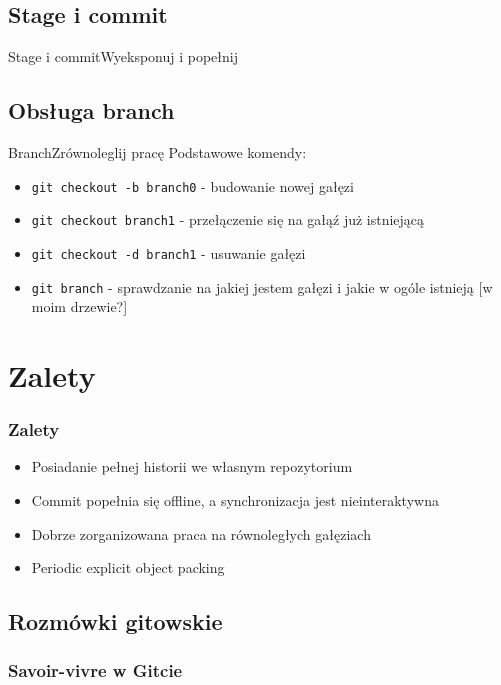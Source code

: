\documentclass{beamer}
\begin{document}
\subsection{Stage i commit}
\begin{frame}{Stage i commit}{Wyeksponuj i popełnij}
 
\end{frame}

\subsection{Obsługa branch}
\begin{frame}{Branch}{Zrównoleglij pracę}
 Podstawowe komendy:
 \begin{itemize}
  \item \texttt{git checkout -b branch0} - budowanie nowej gałęzi
  \item \texttt{git checkout  branch1} - przełączenie się na gałąź już istniejącą
  \item \texttt{git checkout -d branch1} - usuwanie gałęzi
  \item \texttt{git branch} - sprawdzanie na jakiej jestem gałęzi i jakie w ogóle istnieją [w moim drzewie?]
 \end{itemize}

\end{frame}

\section{Zalety}

\begin{frame}
\frametitle{Zalety}
\begin{itemize}
 \item Posiadanie pełnej historii we własnym repozytorium
 \item Commit popełnia się offline, a synchronizacja jest nieinteraktywna
 \item Dobrze zorganizowana praca na równoległych gałęziach
 \item Periodic explicit object packing
\end{itemize}
 
\end{frame}

\subsection{Rozmówki gitowskie}
\begin{frame}
 \frametitle{Savoir-vivre w Gitcie}
\end{frame}
\end{document}
